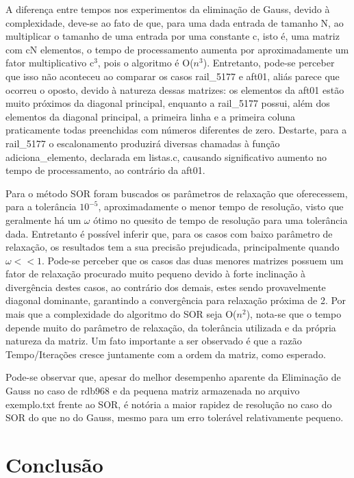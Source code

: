 \documentclass[
	article,			%
	11pt,				%
	oneside,			%
	a4paper,			%
	english,			%
	brazil,				%
	sumario=tradicional
	]{abntex2}
\begin{document}
A diferença entre tempos nos experimentos da eliminação de Gauss, devido à complexidade, deve-se ao fato de que, para uma dada entrada de tamanho N, ao multiplicar o tamanho de uma entrada por uma constante c, isto é, uma matriz com cN elementos, o tempo de processamento aumenta por aproximadamente um fator multiplicativo c$^3$, pois o algoritmo é O($n^3$). Entretanto, pode-se perceber que isso não aconteceu ao comparar os casos rail\_5177 e aft01, aliás parece que ocorreu o oposto, devido à natureza dessas matrizes: os elementos da aft01 estão muito próximos da diagonal principal, enquanto a rail\_5177 possui, além dos elementos da diagonal principal, a primeira linha e a primeira coluna praticamente todas preenchidas com números diferentes de zero. Destarte, para a rail\_5177 o escalonamento produzirá diversas chamadas à função adiciona\_elemento, declarada em listas.c, causando significativo aumento no tempo de processamento, ao contrário da aft01.

Para o método SOR foram buscados os parâmetros de relaxação que oferecessem, para a tolerância $10^{-5}$, aproximadamente o menor tempo de resolução, visto que geralmente há um $\omega$ ótimo no quesito de tempo de resolução para uma tolerância dada. Entretanto é possível inferir que, para os casos com baixo parâmetro de relaxação, os resultados tem a sua precisão prejudicada, principalmente quando $\omega<<1$. Pode-se perceber que os casos das duas menores matrizes possuem um fator de relaxação procurado muito pequeno devido à forte inclinação à divergência destes casos, ao contrário dos demais, estes sendo provavelmente diagonal dominante, garantindo a convergência para relaxação próxima de 2. Por mais que a complexidade do algoritmo do SOR seja O($n^2$), nota-se que o tempo depende muito do parâmetro de relaxação, da tolerância utilizada e da própria natureza da matriz. Um fato importante a ser observado é que a razão Tempo/Iterações cresce juntamente com a ordem da matriz, como esperado.

Pode-se observar que, apesar do melhor desempenho aparente da Eliminação de Gauss no caso de rdb968 e da pequena matriz armazenada no arquivo exemplo.txt frente ao SOR, é notória a maior rapidez de resolução no caso do SOR do que no do Gauss, mesmo para um erro tolerável relativamente pequeno.

\section{Conclusão}
\end{document}
